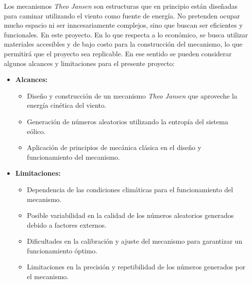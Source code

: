 Los mecanismos \textit{Theo Jansen} son estructuras que en principio están diseñadas para caminar utilizando el viento como fuente de energía. No pretenden ocupar mucho espacio ni ser inncesariamente complejos, sino que buscan ser eficientes y funcionales. En este proyecto. En lo que respecta a lo económico, se busca utilizar materiales accesibles y de bajo costo para la construcción del mecanismo, lo que permitirá que el proyecto sea replicable. En ese sentido se pueden considerar algunos alcances y limitaciones para el presente proyecto:
\begin{itemize}
  \item \textbf{Alcances:}
  \begin{itemize}
    \item Diseño y construcción de un mecanismo \textit{Theo Jansen} que aproveche la energía cinética del viento.
    \item Generación de números aleatorios utilizando la entropía del sistema eólico.
    \item Aplicación de principios de mecánica clásica en el diseño y funcionamiento del mecanismo.
  \end{itemize}
  \item \textbf{Limitaciones:}
  \begin{itemize}
    \item Dependencia de las condiciones climáticas para el funcionamiento del mecanismo.
    \item Posible variabilidad en la calidad de los números aleatorios generados debido a factores externos.
    \item Dificultades en la calibración y ajuste del mecanismo para garantizar un funcionamiento óptimo.
    \item Limitaciones en la precisión y repetibilidad de los números generados por el mecanismo.
  \end{itemize}
\end{itemize}
